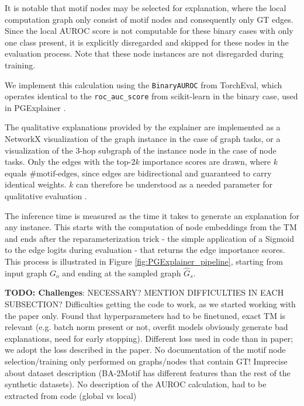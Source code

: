 It is notable that motif nodes may be selected for explanation, where the local computation graph only consist of motif nodes and consequently only \ac{GT} edges. Since the local AUROC score is not computable for these binary cases with only one class present, it is explicitly disregarded and skipped for these nodes in the evaluation process. Note that these node instances are not disregarded during training.

We implement this calculation using the \lstinline|BinaryAUROC| from TorchEval, which operates identical to the \lstinline|roc_auc_score| from scikit-learn \cite{pedregosa2011scikit} in the binary case, used in PGExplainer \cite{luo2020parameterized}.

The qualitative explanations provided by the explainer are implemented as a NetworkX visualization of the graph instance in the case of graph tasks, or a visualization of the $3$-hop subgraph of the instance node in the case of node tasks. Only the edges with the top-$2k$ importance scores are drawn, where $k$ equals $\text{\#motif-edges}$, since edges are bidirectional and guaranteed to carry identical weights. $k$ can therefore be understood as a needed parameter for qualitative evaluation \cite{holdijk2021re}. \bigskip

The inference time is measured as the time it takes to generate an explanation for any instance. This starts with the computation of node embeddings from the \ac{TM} and ends after the reparameterization trick - the simple application of a Sigmoid to the edge logits during evaluation - that returns the edge importance scores. This process is illustrated in Figure \ref{fig:PGExplainer_pipeline}, starting from input graph $G_o$ and ending at the sampled graph $\hat{G}_s$. \bigskip

\textbf{TODO: Challenges}: NECESSARY? MENTION DIFFICULTIES IN EACH SUBSECTION? Difficulties getting the code to work, as we started working with the paper only. Found that hyperparameters had to be finetuned, exact \ac{TM} is relevant (e.g. batch norm present or not, overfit models obviously generate bad explanations, need for early stopping). Different loss used in code than in paper; we adopt the loss described in the paper. No documentation of the motif node selection/training only performed on graphs/nodes that contain GT! Imprecise about dataset description (BA-2Motif has different features than the rest of the synthetic datasets). No description of the AUROC calculation, had to be extracted from code (global vs local) \bigskip

